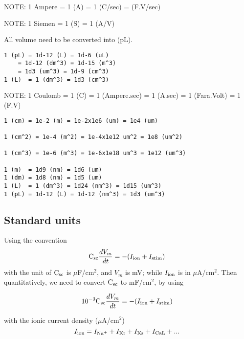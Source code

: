 \begin{framed}
  NOTE: 1 Ampere = 1 (A) = 1 (C/sec) = (F.V/sec)

  NOTE: 1 Siemen = 1 (S) = 1 (A/V)
\end{framed}



All volume need to be converted into (pL).
\begin{verbatim}
1 (pL) = 1d-12 (L) = 1d-6 (uL) 
    = 1d-12 (dm^3) = 1d-15 (m^3) 
    = 1d3 (um^3) = 1d-9 (cm^3)
1 (L)  = 1 (dm^3) = 1d3 (cm^3) 
\end{verbatim}

NOTE: 1 Coulomb = 1 (C) = 1 (Ampere.sec) = 1 (A.sec) = 1 (Fara.Volt) =
1 (F.V)

\begin{verbatim}
1 (cm) = 1e-2 (m) = 1e-2x1e6 (um) = 1e4 (um) 

1 (cm^2) = 1e-4 (m^2) = 1e-4x1e12 um^2 = 1e8 (um^2)

1 (cm^3) = 1e-6 (m^3) = 1e-6x1e18 um^3 = 1e12 (um^3)

1 (m)  = 1d9 (nm) = 1d6 (um)
1 (dm) = 1d8 (nm) = 1d5 (um)
1 (L)  = 1 (dm^3) = 1d24 (nm^3) = 1d15 (um^3)
1 (pL) = 1d-12 (L) = 1d-12 (nm^3) = 1d3 (um^3)
\end{verbatim}

\subsection{Standard units }
\label{sec:standard-units-}

Using the convention
\begin{equation}
  \label{eq:25}
  {\text{C}_\text{sc}}\frac{dV_m}{dt} = -( I_{\text{ion}} + I_{\text{stim}}) 
\end{equation}
with the unit of ${\text{C}_\text{sc}}$ is $\mu$F/cm$^2$, and $V_m$ is mV; while
$I_{\text{ion}}$ is in $\mu$A/cm$^2$. Then quantitatively, we need to convert
${\text{C}_\text{sc}}$ to mF/cm$^2$, by using

\begin{equation}
  \label{eq:49}
  10^{-3}{\text{C}_\text{sc}}\frac{dV_m}{dt} = -( I_{\text{ion}} + I_{\text{stim}})   
\end{equation}

with the ionic current density ($\mu$A/cm$^2$)
\begin{equation}
  \label{eq:26}
  I_{\text{ion}} = I_{\text{Na}^+} + I_{\text{Kr}} + I_{\text{Ks}} + I_{\text{CaL}} + ...
\end{equation}

